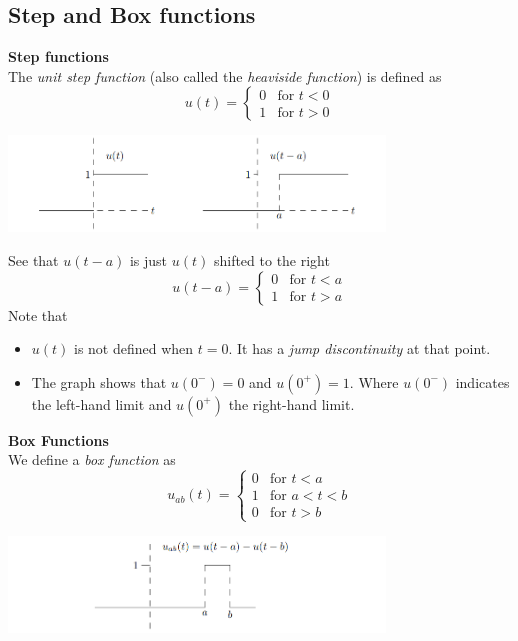 \documentclass{report}
\begin{document}
\subsection{Step and Box functions}
\textbf{Step functions}\\
The \textit{unit step function} (also called the \textit{heaviside function}) is defined as
\begin{equation*}
u(t)=\begin{cases}
0&\text{for }t<0\\
1&\text{for }t>0\end{cases}
\end{equation*}
\begin{center}
\includegraphics[width=10cm]{41}\\
\end{center}
See that $u(t-a)$ is just $u(t)$ shifted to the right
\begin{equation*}
u(t-a)=\begin{cases}
0&\text{for }t<a\\
1&\text{for }t>a\end{cases}
\end{equation*}
Note that
\begin{itemize}
\item $u(t)$ is not defined when $t=0$. It has a \textit{jump discontinuity} at that point.
\item The graph shows that $u(0^-)=0$ and $u(0^+)=1$. Where $u(0^-)$ indicates the left-hand limit and
$u(0^+)$ the right-hand limit.
\end{itemize}
\textbf{Box Functions}\\
We define a \textit{box function} as
\begin{equation*}
u_{ab}(t)=\begin{cases}
0&\text{for }t<a\\
1&\text{for }a<t<b\\
0&\text{for }t>b
\end{cases}
\end{equation*}
\begin{center}
\includegraphics[width=10cm]{42}\\
\end{center}
\end{document}
